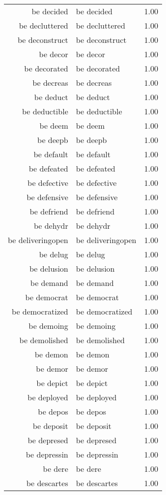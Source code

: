\begin{table}[ht]
\begin{tabular}{rlr}
  be decided & be decided & 1.00 \\ 
  be decluttered & be decluttered & 1.00 \\ 
  be deconstruct & be deconstruct & 1.00 \\ 
  be decor & be decor & 1.00 \\ 
  be decorated & be decorated & 1.00 \\ 
  be decreas & be decreas & 1.00 \\ 
  be deduct & be deduct & 1.00 \\ 
  be deductible & be deductible & 1.00 \\ 
  be deem & be deem & 1.00 \\ 
  be deepb & be deepb & 1.00 \\ 
  be default & be default & 1.00 \\ 
  be defeated & be defeated & 1.00 \\ 
  be defective & be defective & 1.00 \\ 
  be defensive & be defensive & 1.00 \\ 
  be defriend & be defriend & 1.00 \\ 
  be dehydr & be dehydr & 1.00 \\ 
  be deliveringopen & be deliveringopen & 1.00 \\ 
  be delug & be delug & 1.00 \\ 
  be delusion & be delusion & 1.00 \\ 
  be demand & be demand & 1.00 \\ 
  be democrat & be democrat & 1.00 \\ 
  be democratized & be democratized & 1.00 \\ 
  be demoing & be demoing & 1.00 \\ 
  be demolished & be demolished & 1.00 \\ 
  be demon & be demon & 1.00 \\ 
  be demor & be demor & 1.00 \\ 
  be depict & be depict & 1.00 \\ 
  be deployed & be deployed & 1.00 \\ 
  be depos & be depos & 1.00 \\ 
  be deposit & be deposit & 1.00 \\ 
  be depresed & be depresed & 1.00 \\ 
  be depressin & be depressin & 1.00 \\ 
  be dere & be dere & 1.00 \\ 
  be descartes & be descartes & 1.00 \\ 

\end{tabular}
\end{table}
